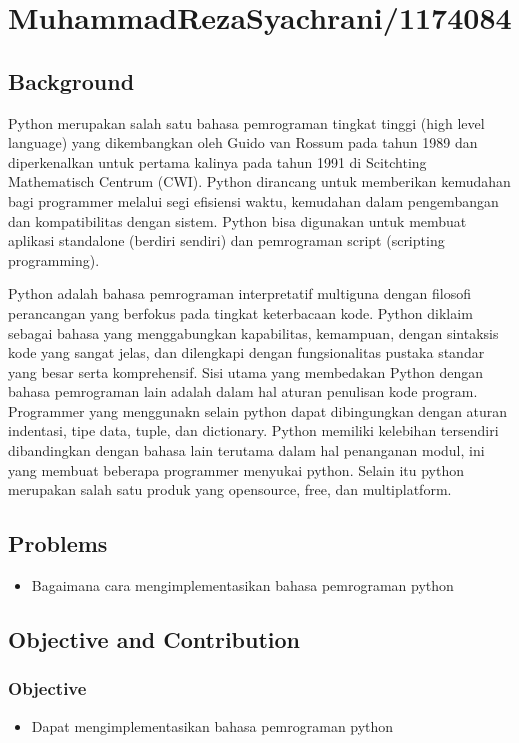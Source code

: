 
\section{MuhammadRezaSyachrani/1174084}
\subsection{Background}
	Python merupakan salah satu bahasa pemrograman tingkat tinggi (high level language) yang dikembangkan oleh Guido van Rossum pada tahun 1989 dan diperkenalkan untuk pertama kalinya pada tahun 1991 di Scitchting Mathematisch Centrum (CWI).
	Python dirancang untuk memberikan kemudahan bagi programmer melalui segi efisiensi waktu, kemudahan dalam pengembangan dan kompatibilitas dengan sistem. Python bisa digunakan untuk membuat aplikasi standalone (berdiri sendiri) dan
	pemrograman script (scripting programming).
	\par
	Python adalah bahasa pemrograman interpretatif multiguna dengan filosofi perancangan yang berfokus pada tingkat keterbacaan kode. Python diklaim sebagai bahasa yang menggabungkan kapabilitas, kemampuan, dengan sintaksis kode yang sangat jelas,
	dan dilengkapi dengan fungsionalitas pustaka standar yang besar serta komprehensif. 
	Sisi utama yang membedakan Python dengan bahasa pemrograman lain adalah dalam hal aturan penulisan kode
	program. Programmer yang menggunakn selain python dapat dibingungkan dengan aturan indentasi, tipe data,
	tuple, dan dictionary. Python memiliki kelebihan tersendiri dibandingkan dengan bahasa lain terutama
	dalam hal penanganan modul, ini yang membuat beberapa programmer menyukai python. Selain itu
	python merupakan salah satu produk yang opensource, free, dan multiplatform.
	
\subsection{Problems}
\begin{itemize}
	\item Bagaimana cara mengimplementasikan bahasa pemrograman python
\end{itemize}
	
\subsection{Objective and Contribution}
\subsubsection{Objective}
\begin{itemize}
	\item Dapat mengimplementasikan bahasa pemrograman python
\end{itemize}
	
